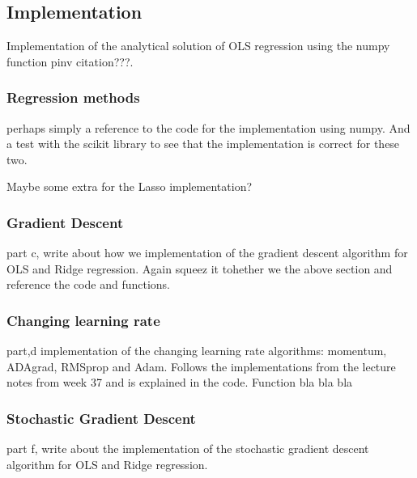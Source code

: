 \documentclass[amssymb,twocolumn,aps]{revtex4}
\begin{document}

\subsection{Implementation}


Implementation of the analytical solution of OLS regression using the numpy function pinv {citation???}.
\subsubsection{Regression methods}

perhaps simply a reference to the code for the implementation using numpy.
And a test with the scikit library to see that the implementation is correct for these two.

Maybe some extra for the Lasso implementation?

\subsubsection{Gradient Descent}
part c, write about how we implementation of the gradient descent algorithm for OLS and Ridge regression.
Again squeez it tohether we the above section and reference the code and functions.

\subsubsection*{Changing learning rate}
part,d implementation of the changing learning rate algorithms: momentum, ADAgrad, RMSprop and Adam.
Follows the implementations from the lecture notes from week 37 \cite{compfys} and is explained in the code.
Function  bla bla bla


\subsubsection*{Stochastic Gradient Descent}
part f, write about the implementation of the stochastic gradient descent algorithm for OLS and Ridge regression.
\end{document}
